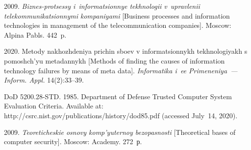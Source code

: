  \begin{multicols}{2}

\renewcommand{\bibname}{\protect\rmfamily References}

{\small\frenchspacing
 {%
 \begin{thebibliography}{99}

 2009. \textit{Biznes-protsessy 
i~informatsionnye tekhnologii v~upravlenii telekommunikatsionnymi kompaniyami} [Business 
processes and information technologies in management of the telecommunication companies]. 
Moscow: Alpina Pabls. 442~p.

 2020. Metody 
nakhozhdeniya prichin sboev v informatsionnykh tekhnologiyakh s pomoshch'yu metadannykh 
[Methods of finding the causes of information technology failures by means of meta data]. 
\textit{Informatika i~ee Primeneniya~--- Inform. Appl.} 14(2):33--39.


DoD 5200.28-STD. 1985. Department of Defense Trusted Computer System Evaluation Criteria. 
Available at: {\sf http://csrc.nist.gov/publications/history/dod85.pdf} (accessed July~14, 2020).

 2009. \textit{Teoreticheskie osnovy 
komp'yuternoy bezopasnosti} [Theoretical bases of computer security]. Moscow: Academy. 272~р.


\end{thebibliography}}}
\end{multicols}
